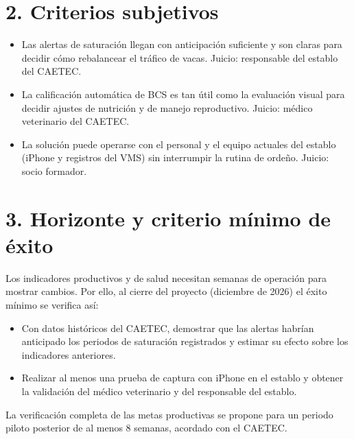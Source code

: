 \documentclass[11pt,letterpaper,DIV=12]{scrartcl}
\begin{document}
\section{2. Criterios subjetivos}

\begin{itemize}
  \item Las alertas de saturación llegan con anticipación suficiente y son claras para decidir cómo rebalancear el tráfico de vacas. Juicio: responsable del establo del CAETEC.
  \item La calificación automática de BCS es tan útil como la evaluación visual para decidir ajustes de nutrición y de manejo reproductivo. Juicio: médico veterinario del CAETEC.
  \item La solución puede operarse con el personal y el equipo actuales del establo (iPhone y registros del VMS) sin interrumpir la rutina de ordeño. Juicio: socio formador.
\end{itemize}

\section{3. Horizonte y criterio mínimo de éxito}

Los indicadores productivos y de salud necesitan semanas de operación para mostrar cambios. Por ello, al cierre del proyecto (diciembre de 2026) el éxito mínimo se verifica así:

\begin{itemize}
  \item Con datos históricos del CAETEC, demostrar que las alertas habrían anticipado los periodos de saturación registrados y estimar su efecto sobre los indicadores anteriores.
  \item Realizar al menos una prueba de captura con iPhone en el establo y obtener la validación del médico veterinario y del responsable del establo.
\end{itemize}

La verificación completa de las metas productivas se propone para un periodo piloto posterior de al menos 8 semanas, acordado con el CAETEC.

\printbibliography
\end{document}
